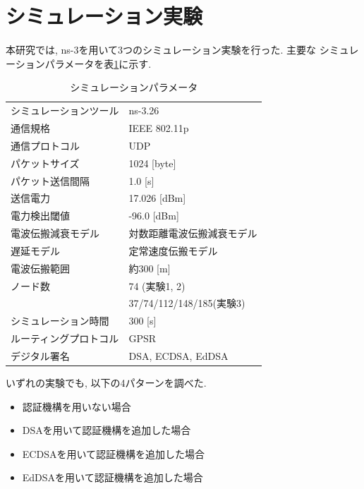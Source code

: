 \documentclass[a4j,9pt,twocolumn]{jsarticle}
\begin{document}
\section{シミュレーション実験}
本研究では, ns-3を用いて3つのシミュレーション実験を行った. 主要な
シミュレーションパラメータを表\ref{tab:parameter}に示す. 
\begin{table}[h]
  \centering
  \caption{シミュレーションパラメータ}
  \label{tab:parameter}
  \begin{tabular}{ll} \hline
    シミュレーションツール & ns-3.26 \\
    通信規格 & IEEE 802.11p \\
    通信プロトコル & UDP \\
    パケットサイズ & 1024 [byte] \\
    パケット送信間隔 & 1.0 [s] \\
    送信電力 & 17.026 [dBm] \\
    電力検出閾値 & -96.0 [dBm] \\
    電波伝搬減衰モデル & 対数距離電波伝搬減衰モデル \\
    遅延モデル & 定常速度伝搬モデル \\
    電波伝搬範囲 & 約300 [m] \\
    ノード数 & 74 (実験1, 2)\\
    & 37/74/112/148/185(実験3) \\
    シミュレーション時間 & 300 [s] \\
    ルーティングプロトコル & GPSR \\
    デジタル署名 & DSA, ECDSA, EdDSA \\ \hline
  \end{tabular}
\end{table}

\indent いずれの実験でも, 以下の4パターンを調べた. 
\begin{itemize}
    \item 認証機構を用いない場合
    \item DSAを用いて認証機構を追加した場合
    \item ECDSAを用いて認証機構を追加した場合
    \item EdDSAを用いて認証機構を追加した場合
\end{itemize}
\end{document}
